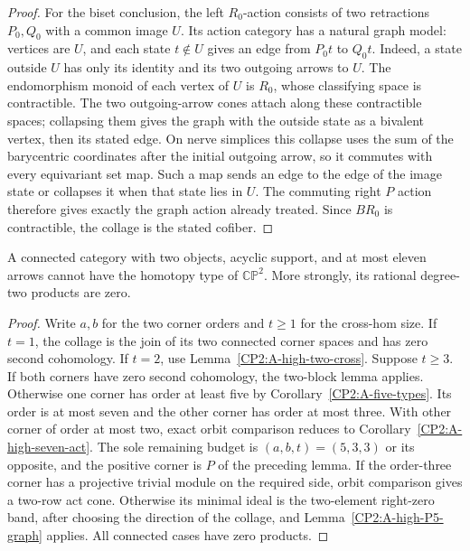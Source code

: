 \begin{proof}
For the biset conclusion, the left $R_0$-action consists
of two retractions $P_0,Q_0$ with a common image $U$.
Its action category has a natural graph model: vertices
are $U$, and each state $t\notin U$ gives an edge from
$P_0t$ to $Q_0t$.  Indeed, a state outside $U$ has only
its identity and its two outgoing arrows to $U$.  The
endomorphism monoid of each vertex of $U$ is $R_0$,
whose classifying space is contractible.  The two
outgoing-arrow cones attach along these contractible
spaces; collapsing them gives the graph with the outside
state as a bivalent vertex, then its stated edge.
On nerve simplices this collapse uses the sum of the
barycentric coordinates after the initial outgoing
arrow, so it commutes with every equivariant set map.
Such a map sends an edge to the edge of the image state
or collapses it when that state lies in $U$.  The
commuting right $P$ action therefore gives exactly the
graph action already treated.  Since $BR_0$ is
contractible, the collage is the stated cofiber.
\end{proof}

\begin{corollary}
\label{CP2:A-high-two-objects}
A connected category with two objects, acyclic support, and at most
eleven arrows cannot have the homotopy type of $\mathbb{CP}^2$.
More strongly, its rational degree-two products are zero.
\end{corollary}
\begin{proof}
Write $a,b$ for the two corner orders and $t\geq1$ for
the cross-hom size.  If $t=1$, the collage is the join
of its two connected corner spaces and has zero second
cohomology.  If $t=2$, use
Lemma~\ref{CP2:A-high-two-cross}.  Suppose $t\geq3$.
If both corners have zero second cohomology, the
two-block lemma applies.  Otherwise one corner has
order at least five by Corollary~\ref{CP2:A-five-types}.
Its order is at most seven and the other corner has
order at most three.  With other corner of order at most
two, exact orbit comparison reduces to
Corollary~\ref{CP2:A-high-seven-act}.
The sole remaining budget is $(a,b,t)=(5,3,3)$ or its
opposite, and the positive corner is $P$ of the preceding
lemma.  If the order-three corner has a projective trivial
module on the required side, orbit comparison gives a
two-row act cone.  Otherwise its minimal ideal is the
two-element right-zero band, after choosing the direction
of the collage, and Lemma~\ref{CP2:A-high-P5-graph}
applies.  All connected cases have zero products.
\end{proof}


